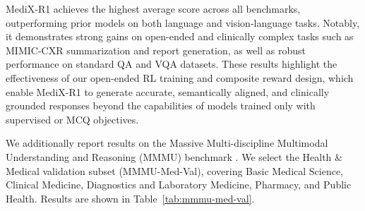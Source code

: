 \documentclass{article}
\theoremstyle{plain}
\theoremstyle{definition}
\theoremstyle{remark}
\begin{document}
MediX-R1 achieves the highest average score across all benchmarks, outperforming prior models on both language and vision-language tasks. Notably, it demonstrates strong gains on open-ended and clinically complex tasks such as MIMIC-CXR summarization and report generation, as well as robust performance on standard QA and VQA datasets. These results highlight the effectiveness of our open-ended RL training and composite reward design, which enable MediX-R1 to generate accurate, semantically aligned, and clinically grounded responses beyond the capabilities of models trained only with supervised or MCQ objectives.

We additionally report results on the Massive Multi-discipline Multimodal Understanding and Reasoning (MMMU) benchmark \citep{yue2024mmmumassivemultidisciplinemultimodal}. We select the Health \& Medical validation subset (MMMU-Med-Val), covering Basic Medical Science, Clinical Medicine, Diagnostics  and Laboratory Medicine, Pharmacy, and Public Health. Results are shown in Table~\ref{tab:mmmu-med-val}.

\begin{table}[t!]
\centering
\footnotesize
{}
\caption{\textbf{MMMU Medical Val results.} Accuracy on the Health \& Medical validation subset of MMMU (image-text).}
\label{tab:mmmu-med-val}
\end{table}
\end{document}
